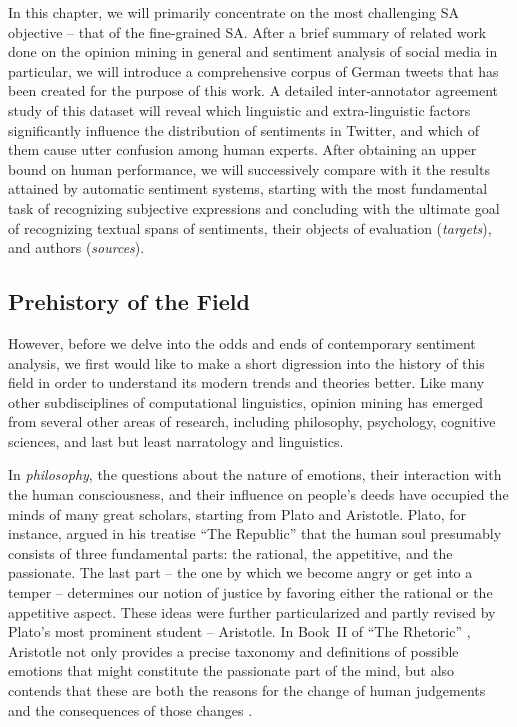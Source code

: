 In this chapter, we will primarily concentrate on the most challenging
SA objective -- that of the fine-grained SA.  After a brief summary of
related work done on the opinion mining in general and sentiment
analysis of social media in particular, we will introduce a
comprehensive corpus of German tweets that has been created for the
purpose of this work.  A detailed inter-annotator agreement study of
this dataset will reveal which linguistic and extra-linguistic factors
significantly influence the distribution of sentiments in Twitter, and
which of them cause utter confusion among human experts.  After
obtaining an upper bound on human performance, we will successively
compare with it the results attained by automatic sentiment systems,
starting with the most fundamental task of recognizing subjective
expressions and concluding with the ultimate goal of recognizing
textual spans of sentiments, their objects of evaluation
(\emph{targets}), and authors (\emph{sources}).

\subsection{Prehistory of the Field}

However, before we delve into the odds and ends of contemporary
sentiment analysis, we first would like to make a short digression
into the history of this field in order to understand its modern
trends and theories better.  Like many other subdisciplines of
computational linguistics, opinion mining has emerged from several
other areas of research, including philosophy, psychology, cognitive
sciences, and last but least narratology and linguistics.

In \emph{philosophy}, the questions about the nature of emotions,
their interaction with the human consciousness, and their influence on
people's deeds have occupied the minds of many great scholars,
starting from Plato and Aristotle.  Plato, for instance, argued in his
treatise ``The Republic'' \citep[Book~IV]{Plato:91} that the human
soul presumably consists of three fundamental parts: the rational, the
appetitive, and the passionate.  The last part -- the one by which we
become angry or get into a temper -- determines our notion of justice
by favoring either the rational or the appetitive aspect.  These ideas
were further particularized and partly revised by Plato's most
prominent student -- Aristotle.  In Book~II of ``The Rhetoric''
\citep{Aristotle:54}, Aristotle not only provides a precise taxonomy
and definitions of possible emotions that might constitute the
passionate part of the mind, but also contends that these are both the
reasons for the change of human judgements and the consequences of
those changes \cite[cf.][p. 157]{Leighton:82}.


